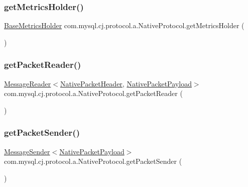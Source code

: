 \subsubsection{\texorpdfstring{get\+Metrics\+Holder()}{getMetricsHolder()}}
{\footnotesize\ttfamily \mbox{\hyperlink{classcom_1_1mysql_1_1cj_1_1log_1_1_base_metrics_holder}{Base\+Metrics\+Holder}} com.\+mysql.\+cj.\+protocol.\+a.\+Native\+Protocol.\+get\+Metrics\+Holder (\begin{DoxyParamCaption}{ }\end{DoxyParamCaption})}

\mbox{\label{classcom_1_1mysql_1_1cj_1_1protocol_1_1a_1_1_native_protocol_a04e273fff078fd0290c76ad9fd78744e}} 
\subsubsection{\texorpdfstring{get\+Packet\+Reader()}{getPacketReader()}}
{\footnotesize\ttfamily \mbox{\hyperlink{interfacecom_1_1mysql_1_1cj_1_1protocol_1_1_message_reader}{Message\+Reader}}$<$\mbox{\hyperlink{classcom_1_1mysql_1_1cj_1_1protocol_1_1a_1_1_native_packet_header}{Native\+Packet\+Header}}, \mbox{\hyperlink{classcom_1_1mysql_1_1cj_1_1protocol_1_1a_1_1_native_packet_payload}{Native\+Packet\+Payload}}$>$ com.\+mysql.\+cj.\+protocol.\+a.\+Native\+Protocol.\+get\+Packet\+Reader (\begin{DoxyParamCaption}{ }\end{DoxyParamCaption})}

\mbox{\label{classcom_1_1mysql_1_1cj_1_1protocol_1_1a_1_1_native_protocol_aa2f4f22a35bd59ec16ca4cbf87e3fa6e}} 
\subsubsection{\texorpdfstring{get\+Packet\+Sender()}{getPacketSender()}}
{\footnotesize\ttfamily \mbox{\hyperlink{interfacecom_1_1mysql_1_1cj_1_1protocol_1_1_message_sender}{Message\+Sender}}$<$\mbox{\hyperlink{classcom_1_1mysql_1_1cj_1_1protocol_1_1a_1_1_native_packet_payload}{Native\+Packet\+Payload}}$>$ com.\+mysql.\+cj.\+protocol.\+a.\+Native\+Protocol.\+get\+Packet\+Sender (\begin{DoxyParamCaption}{ }\end{DoxyParamCaption})}

